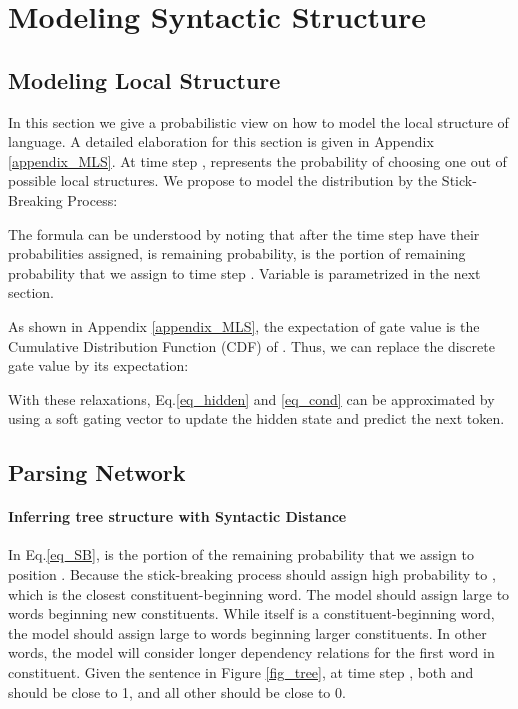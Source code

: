 \documentclass{article} \usepackage{iclr2018_conference,times}
\begin{document}
\section{Modeling Syntactic Structure}
\subsection{Modeling Local Structure} \label{MLS}
In this section we give a probabilistic view on how to model the local structure of language. A detailed elaboration for this section is given in Appendix \ref{appendix_MLS}.
At time step ,  represents the probability of choosing one out of  possible local structures. We propose to model the distribution by the Stick-Breaking Process:

The formula can be understood by noting that after the time step  have their probabilities assigned,  is remaining probability,  is the portion of remaining probability that we assign to time step . Variable  is parametrized in the next section.


As shown in Appendix \ref{appendix_MLS}, the expectation of gate value  is the Cumulative Distribution Function (CDF) of . Thus, we can replace the discrete gate value by its expectation:

With these relaxations, Eq.\ref{eq_hidden} and \ref{eq_cond} can be approximated by using a soft gating vector to update the hidden state and predict the next token. 

\subsection{Parsing Network} \label{sec_tree}
\paragraph{Inferring tree structure with Syntactic Distance}
In Eq.\ref{eq_SB},  is the portion of the remaining probability that we assign to position . Because the stick-breaking process should assign high probability to , which is the closest constituent-beginning word. The model should assign large  to words beginning new constituents. While  itself is a constituent-beginning word, the model should assign large  to words beginning larger constituents. In other words, the model will consider longer dependency relations for the first word in constituent. Given the sentence in Figure \ref{fig_tree}, at time step , both  and  should be close to 1, and all other  should be close to 0. 
\end{document}
